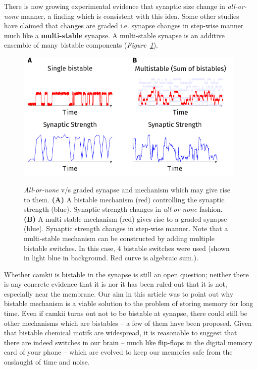 \documentclass[]{resonance}
\newcommand\Fig[1]{\textit{Figure~\ref{#1}}}
\begin{document}
There is now growing experimental evidence that synaptic size change in
\textit{all-or-none} manner, a finding which is consistent with this idea. Some
other studies have claimed that changes are graded i.e. synapse changes in
step-wise manner much like a \textbf{multi-stable} synapse. A multi-stable
synapse is an additive ensemble of many bistable components
(\Fig{fig:fig_bistable_multistable}).

\begin{figure}[ht!]
    \centering
    \caption{\textit{All-or-none} v/s graded synapse and mechanism which may
        give rise to them. \textbf{(A)} A bistable mechanism (red) controlling the 
        synaptic strength (blue). Synaptic strength changes in \textit{all-or-none}
        fashion. \textbf{(B)} A multi-stable mechanism (red) gives rise to a
        graded synapse (blue). Synaptic strength changes in step-wise manner. Note that 
        a multi-stable mechanism can be constructed by adding multiple bistable
        switches. In this case, 4 bistable switches were used (shown in light
        blue in background. Red curve is algebraic sum.).
    }
    \includegraphics[width=\linewidth]{./figures/bistable_multistabe_synapse.pdf}
    \label{fig:fig_bistable_multistable}
\end{figure}


Whether \gls{camkii} is bistable in the synapse is still an open question;
neither there is any concrete evidence that it is nor it has been ruled out that
it is not, especially near the membrane. Our aim in this article was to point
out why bistable mechanism is a viable solution to the problem of storing memory
for long time. Even if \gls{camkii} turns out not to be bistable at synapse,
there could still be other mechanisms which are bistables -- a few of them have
been proposed. Given that bistable chemical motifs are widespread, it is
reasonable to suggest that there are indeed switches in our brain -- much like
flip-flops in the digital memory card of your phone -- which are evolved to keep
our memories safe from the onslaught of time and noise.
\end{document}
